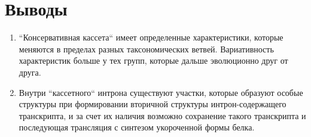\clearpage
\section{Выводы}

\begin{enumerate}[left=\parindent]
    \item ``Консервативная кассета`` имеет определенные характеристики, которые меняются в пределах разных таксономических ветвей. Вариативность характеристик больше у тех групп, которые дальше эволюционно друг от друга.
    \item Внутри ``кассетного`` интрона существуют участки, которые образуют особые структуры при формировании вторичной структуры интрон-содержащего транскрипта, и за счет их наличия возможно сохранение такого транскрипта и последующая трансляция с синтезом укороченной формы белка.
\end{enumerate}
